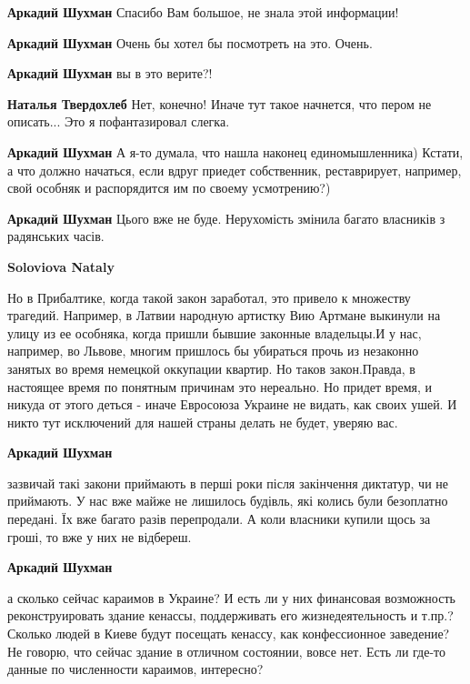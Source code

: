 \begin{itemize}
\begin{itemize}
\begin{itemize}
\textbf{Аркадий Шухман} Спасибо Вам большое, не знала этой информации!
\end{itemize} %

\textbf{Аркадий Шухман} Очень бы хотел бы посмотреть на это. Очень.

\textbf{Аркадий Шухман} вы в это верите?!

\begin{itemize} %
\textbf{Наталья Твердохлеб} Нет, конечно! Иначе тут такое начнется, что пером не описать... Это я пофантазировал слегка.

\textbf{Аркадий Шухман} А я-то думала, что нашла наконец единомышленника) Кстати, а что должно начаться, если вдруг приедет собственник, реставрирует, например, свой особняк и распорядится им по своему усмотрению?)
\end{itemize} %

\textbf{Аркадий Шухман} Цього вже не буде. Нерухомість змінила багато власників з радянських часів.

\begin{itemize} %
\textbf{Soloviova Nataly} 

Но в Прибалтике, когда такой закон заработал, это привело к множеству трагедий.
Например, в Латвии народную артистку Вию Артмане выкинули на улицу из ее
особняка, когда пришли бывшие законные владельцы.И у нас, например, во Львове,
многим пришлось бы убираться прочь из незаконно занятых во время немецкой
оккупации квартир. Но таков закон.Правда, в настоящее время по понятным
причинам это нереально. Но придет время, и никуда от этого деться - иначе
Евросоюза Украине не видать, как своих ушей. И никто тут исключений для нашей
страны делать не будет, уверяю вас.

\textbf{Аркадий Шухман} 

зазвичай такі закони приймають в перші роки після закінчення диктатур, чи не
приймають. У нас вже майже не лишилось будівль, які колись були безоплатно
передані. Їх вже багато разів перепродали. А коли власники купили щось за
гроші, то вже у них не відбереш.

\end{itemize} %

\textbf{Аркадий Шухман} 

а сколько сейчас караимов в Украине? И есть ли у них финансовая возможность
реконструировать здание кенассы, поддерживать его жизнедеятельность и т.пр.?
Сколько людей в Киеве будут посещать кенассу, как конфессионное заведение? Не
говорю, что сейчас здание в отличном состоянии, вовсе нет. Есть ли где-то
данные по численности караимов, интересно?


\end{itemize}
\end{itemize}
